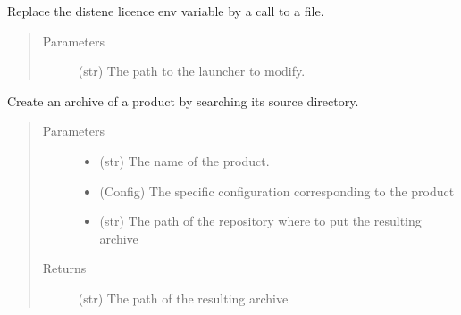 \documentclass[a4paper,10pt,english]{sphinxmanual}
\begin{document}
\begin{fulllineitems}
\label{\detokenize{apidoc_commands/commands:commands.package.hack_for_distene_licence}}
Replace the distene licence env variable by a call to a file.
\begin{quote}\begin{description}
\item[{Parameters}] \leavevmode
{} \textendash{} (str) The path to the launcher to modify.

\end{description}\end{quote}

\end{fulllineitems}


\begin{fulllineitems}
\label{\detokenize{apidoc_commands/commands:commands.package.make_archive}}
Create an archive of a product by searching its source directory.
\begin{quote}\begin{description}
\item[{Parameters}] \leavevmode\begin{itemize}
\item {} 
 \textendash{} (str) The name of the product.

\item {} 
 \textendash{} (Config)
The specific configuration corresponding to the product

\item {} 
 \textendash{} (str) 
The path of the repository where to put the resulting archive

\end{itemize}

\item[{Returns}] \leavevmode
(str) The path of the resulting archive

\end{description}\end{quote}

\end{fulllineitems}
\end{document}
